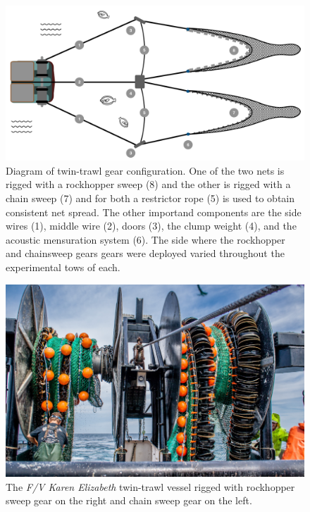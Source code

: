 \documentclass[
  12pt,
]{article}
\newlength{\cslhangindent}
\newlength{\cslentryspacingunit} %
\newenvironment{CSLReferences}[2] %
 {%
  \setlength{\parindent}{0pt}
  \ifodd #1
  \let\oldpar\par
  \def\par{\hangindent=\cslhangindent\oldpar}
  \fi
  \setlength{\parskip}{#2\cslentryspacingunit}
 }%
 {}
\begin{document}
\pagebreak



\hypertarget{refs}{}
\begin{CSLReferences}{0}{0}
\end{CSLReferences}

\pagebreak

\begin{figure}
\caption{Diagram of twin-trawl gear configuration. One of the two nets is rigged with a rockhopper sweep (8) and the other is rigged with a chain sweep (7) and for both a restrictor rope (5) is used to obtain consistent net spread. The other importand components are the side wires (1), middle wire (2), doors (3), the clump weight (4), and the acoustic mensuration system (6).  The side where the rockhopper and chainsweep gears gears were deployed varied throughout the experimental tows of each.}\label{twin_trawl_diagram}
\begin{center}
\includegraphics[width = \textwidth]{twin_trawl_diagram.pdf}
\end{center}
\end{figure}

\begin{figure}
\caption{The \textsl{F/V Karen Elizabeth} twin-trawl vessel rigged with rockhopper sweep gear on the right and chain sweep gear on the left.}\label{twin_trawl_photo}
\begin{center}
\includegraphics[width = \textwidth]{twin_trawl_photo_small.png}
\end{center}
\end{figure}
\end{document}

